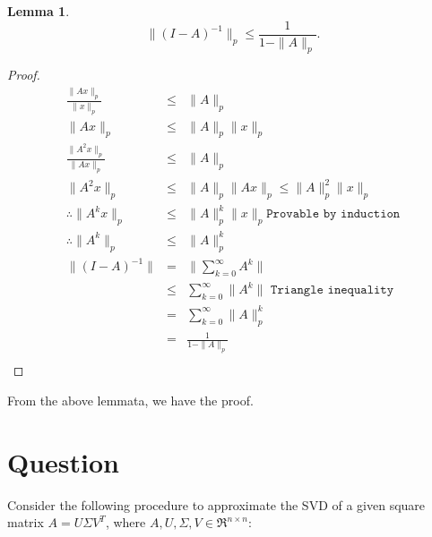 \documentclass[10pt]{amsart}
\newtheorem{lem}[thm]{Lemma}
\theoremstyle{remark}
\begin{document}
\begin{lem}
$$\|(I-A)^{-1}\|_p \leq \frac{1}{1-\|A\|_p}.$$
\end{lem}
\begin{proof}

\begin{eqnarray*}
\frac{\|Ax\|_{p}}{\|x\|_{p}} &\leq& \|A\|_{p}\\
\|Ax\|_{p} &\leq& \|A\|_{p}\|x\|_{p}\\
\frac{\|A^{2}x\|_{p}}{\|Ax\|_{p}} &\leq& \|A\|_{p}\\
\|A^{2}x\|_{p} &\leq& \|A\|_{p}\|Ax\|_{p} \leq \|A\|_{p}^{2}\|x\|_{p}\\
\therefore \|A^{k}x\|_{p} &\leq& \|A\|_{p}^{k}\|x\|_{p} \texttt{Provable by induction}\\
\therefore \|A^{k}\|_{p} &\leq& \|A\|_{p}^{k} \\
\|(I-A)^{-1}\| &=& \|\sum_{k=0}^{\infty}A^k\|\\
&\leq& \sum_{k=0}^{\infty}\|A^k\| \texttt{ Triangle inequality}\\
&=& \sum_{k=0}^{\infty}\|A\|_{p}^{k} \\
&=& \frac{1}{1-\|A\|_{p}}\\
\end{eqnarray*}
\end{proof}

From the above lemmata, we have the proof.

\section{Question}
Consider the following procedure to approximate the SVD of a given square matrix $A=U\Sigma V^T$, where $A,U,\Sigma,V \in \Re^{n\times n}$:
\end{document}
